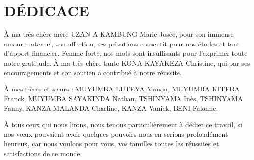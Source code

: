 \chapter*{DÉDICACE}
    À ma très chère mère UZAN A KAMBUNG Marie-Josée, pour son immense amour maternel,
    son affection, ses privations consentit pour nos études et tant d’apport financier. Femme forte, nos mots
    sont insuffisants pour l’exprimer toute notre gratitude. 
    À ma très chère tante KONA KAYAKEZA Christine, qui par ses encouragements et son soutien a contribué à notre réussite.
    \par
    À mes frères et sœurs : MUYUMBA LUTEYA Manou, MUYUMBA KITEBA Franck, MUYUMBA SAYAKINDA Nathan, TSHINYAMA Inès, TSHINYAMA 
    Fanny, KANZA MALANDA Charline, KANZA Vanick, BENI Falonne.
    \par
    À tous ceux qui nous lirons, nous tenons particulièrement à dédier ce travail, si nos vœux
    pouvaient avoir quelques pouvoirs nous en serions profondément heureux, car nous
    voulons pour vous, vos familles toutes les réussites et satisfactions de ce monde.